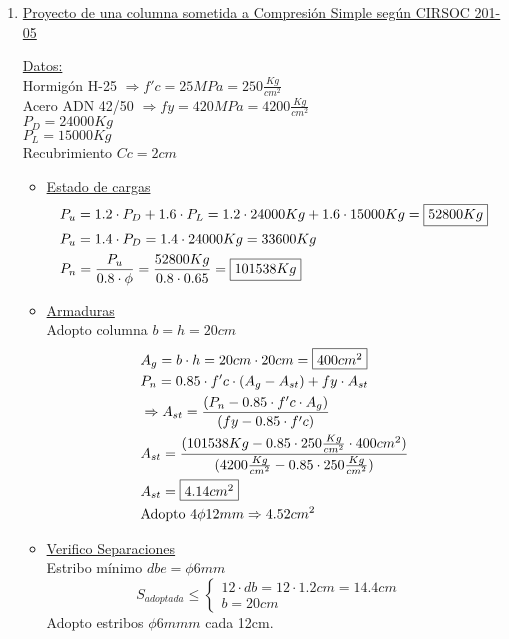 \begin{enumerate}
\item \underline{Proyecto de una columna sometida a Compresión Simple según CIRSOC 201-05}

\underline{Datos:}\\
Hormigón H-25 $\Rightarrow f'c = 25 MPa = 250 \frac{Kg}{cm^2}$\\
Acero ADN 42/50 $\Rightarrow fy = 420 MPa = 4200 \frac{Kg}{cm^2}$\\
$P_D = 24000Kg$ \\
$P_L = 15000Kg$ \\
Recubrimiento $Cc = 2cm$\\

\begin{itemize}
\item \underline{Estado de cargas}
\begin{align*}
& P_u = 1.2 \cdot P_D + 1.6 \cdot P_L = 1.2 \cdot 24000Kg  + 1.6 \cdot 15000Kg = \framebox{$52800Kg$}\\
& P_u = 1.4 \cdot P_D = 1.4 \cdot 24000Kg = 33600Kg\\
& P_n = \frac{P_u}{0.8 \cdot \phi} = \frac{52800Kg}{0.8 \cdot 0.65} = \framebox{$101538Kg$}
\end{align*}

\item \underline{Armaduras} \\
Adopto columna $b = h = 20cm$
\begin{align*}
& A_g = b \cdot h = 20cm \cdot 20cm = \framebox{$400cm^2$} \\
& P_n = 0.85 \cdot f'c \cdot (A_g - A_{st}) + fy \cdot A_{st} \\
& \Rightarrow A_{st} = \frac{(P_n - 0.85 \cdot f'c \cdot A_g)}{(fy - 0.85 \cdot f'c)} \\
& A_{st} = \frac{(101538Kg - 0.85 \cdot 250 \frac{Kg}{cm^2} \cdot 400cm^2)}{(4200 \frac{Kg}{cm^2} - 0.85 \cdot 250 \frac{Kg}{cm^2})} \\
& A_{st} = \framebox{$4.14cm^2$} \\
& \text{Adopto }4 \phi 12mm \Rightarrow 4.52cm^2
\end{align*}

\item \underline{Verifico Separaciones} \\
Estribo mínimo $dbe = \phi 6mm$\\
\[ S_{adoptada} \leq \left\{ \begin{array}{ll}
         12 \cdot db = 12 \cdot 1.2cm = 14.4cm & \\
         b = 20cm & \end{array} \right. \]
Adopto estribos $\phi 6mmm$ cada 12cm.
\end{itemize}


\end{enumerate}
